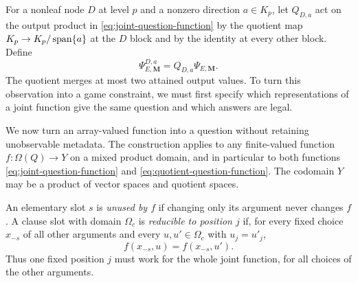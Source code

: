 For a nonleaf node $D$ at level $p$ and a nonzero direction $a\in K_p$,
let $Q_{D,a}$ act on the output product in
\eqref{eq:joint-question-function} by the quotient map
$K_p\to K_p/\operatorname{span}\{a\}$ at the $D$ block and by the identity at every
other block.  Define
\begin{equation}\label{eq:quotient-question-function}
 \Psi^{D,a}_{E,\mathbf M}=Q_{D,a}\Psi_{E,\mathbf M}.
\end{equation}
The quotient merges at most two attained output values.  To turn this
observation into a game constraint, we must first specify which representations
of a joint function give the same question and which answers are legal.

We now turn an array-valued function into a question without retaining
unobservable metadata.  The construction applies to any finite-valued
function $f:\Omega(Q)\to Y$ on a mixed product domain, and in particular
to both functions \eqref{eq:joint-question-function} and
\eqref{eq:quotient-question-function}.  The codomain $Y$ may be a product
of vector spaces and quotient spaces.

An elementary slot $s$ is \emph{unused by $f$} if changing only its
argument never changes $f$.  A clause slot with domain $\Omega_c$ is
\emph{reducible to position $j$} if, for every fixed choice $x_{-s}$ of
all other arguments and every $u,u'\in\Omega_c$ with $u_j=u'_j$,
\begin{equation}\label{eq:global-singleton-factorization}
 f(x_{-s},u)=f(x_{-s},u').
\end{equation}
Thus one fixed position $j$ must work for the whole joint function, for
all choices of the other arguments.

